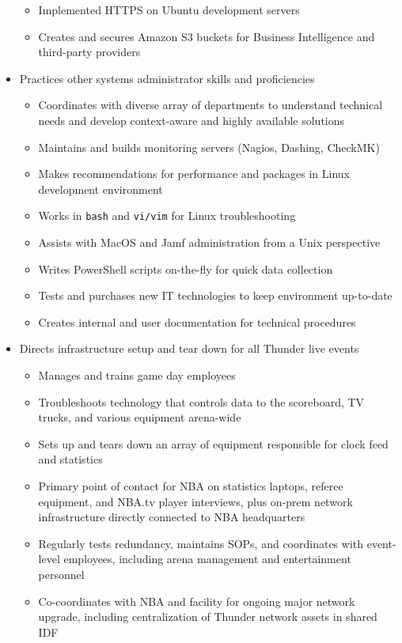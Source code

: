 \documentclass[line]{res}
\begin{document}
\begin{resume}
\begin{itemize}
\begin{itemize}
				\item Implemented HTTPS on Ubuntu development servers
				\item Creates and secures Amazon S3 buckets for Business Intelligence and third-party providers
			\end{itemize}
		\item Practices other systems administrator skills and proficiencies
			\begin{itemize}
				\item Coordinates with diverse array of departments to understand technical needs and develop context-aware and highly available solutions  
				\item Maintains and builds monitoring servers (Nagios, Dashing, CheckMK)
				\item Makes recommendations for performance and packages in Linux development environment
				\item Works in \texttt{bash} and \texttt{vi/vim} for Linux troubleshooting
				\item Assists with MacOS and Jamf administration from a Unix perspective
				\item Writes PowerShell scripts on-the-fly for quick data collection
				\item Tests and purchases new IT technologies to keep environment up-to-date
				\item Creates internal and user documentation for technical procedures
			\end{itemize}
		\item Directs infrastructure setup and tear down for all Thunder live events
			\begin{itemize}
				\item Manages and trains game day employees
				\item Troubleshoots technology that controls data to the scoreboard, TV trucks, and various equipment arena-wide
				\item Sets up and tears down an array of equipment responsible for clock feed and statistics
				\item Primary point of contact for NBA on statistics laptops, referee equipment, and NBA.tv player interviews, plus on-prem network infrastructure directly connected to NBA headquarters 
				\item Regularly tests redundancy, maintains SOPs, and coordinates with event-level employees, including arena management and entertainment personnel
				\item Co-coordinates with NBA and facility for ongoing major network upgrade, including centralization of Thunder network assets in shared IDF 

\end{itemize}
\end{itemize}
\end{resume}
\end{document}
